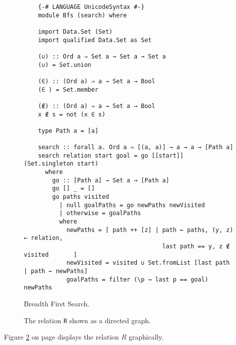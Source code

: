 \begin{figure}[!ht]
\centering
\begin{verbatim}
    {-# LANGUAGE UnicodeSyntax #-}
    module Bfs (search) where
    
    import Data.Set (Set)
    import qualified Data.Set as Set
    
    (∪) :: Ord a ⇒ Set a → Set a → Set a
    (∪) = Set.union
    
    (∈) :: (Ord a) ⇒ a → Set a → Bool
    (∈ ) = Set.member
    
    (∉) :: (Ord a) ⇒ a → Set a → Bool
    x ∉ s = not (x ∈ s)
    
    type Path a = [a]
    
    search :: forall a. Ord a ⇒ [(a, a)] → a → a → [Path a]
    search relation start goal = go [[start]] (Set.singleton start)
      where
        go :: [Path a] → Set a → [Path a]
        go [] _ = []
        go paths visited
          | null goalPaths = go newPaths newVisited
          | otherwise = goalPaths
          where
            newPaths = [ path ++ [z] | path ← paths, (y, z) ← relation, 
                                       last path == y, z ∉ visited       ]
            newVisited = visited ∪ Set.fromList [last path | path ← newPaths]
            goalPaths = filter (\p → last p == goal) newPaths
\end{verbatim}
\vspace*{-0.3cm}
\caption{Breadth First Search.}
\label{fig:bfs.hs}
\end{figure}
\noindent


\begin{figure}[h]
  \centering


  \caption{The relation \texttt{R} shown as a directed graph.}
  \label{fig:wolf-goat-cabbage.pdf}
\end{figure}



\noindent
Figure \ref{fig:wolf-goat-cabbage.pdf} on page \pageref{fig:wolf-goat-cabbage.pdf} displays the relation $R$ graphically.





